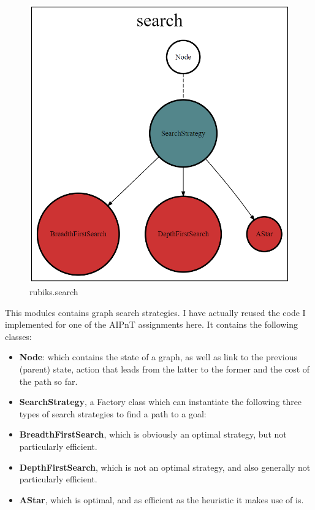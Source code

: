 \begin{figure}[H]
\centering
\includegraphics[scale=0.25]{./Figures/codebasesearch}
\caption[Codebase]{rubiks.search}
\label{fig:Codebasesearch}
\end{figure}
This modules contains graph search strategies. I have actually reused the code I implemented for one of the AIPnT assignments here. It contains the following classes:
\begin{itemize}
\item \textbf{Node}: which contains the state of a graph, as well as link to the previous (parent) state, action that leads from the latter to the former and the cost of the path so far.
\item \textbf{SearchStrategy}, a Factory class which can instantiate the following three types of search strategies to find a path to a goal:
\item \textbf{BreadthFirstSearch}, which is obviously an optimal strategy, but not particularly efficient.
\item \textbf{DepthFirstSearch}, which is not an optimal strategy, and also generally not particularly efficient.
\item \textbf{AStar}, which is optimal, and as efficient as the heuristic it makes use of is.
\end{itemize}

